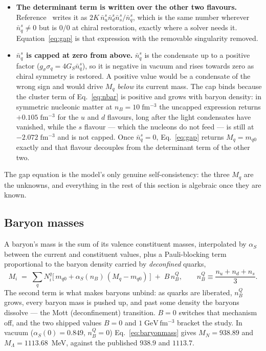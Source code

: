 \documentclass[aps,prc,onecolumn,superscriptaddress,nofootinbib,10pt]{revtex4-2}
\newcommand{\nB}{n_B}
\newcommand{\nbs}{\bar{n}^s}
\begin{document}
\begin{itemize}
\item \textbf{The determinant term is written over the other two flavours.}
  Reference~\cite{Xia2024} writes it as
  $2 K\, \nbs_u \nbs_d \nbs_s / \nbs_q$, which is the same number wherever
  $\nbs_q \ne 0$ but is $0/0$ at chiral restoration, exactly where a solver
  needs it. Equation~\eqref{eq:gap} is that expression with the removable
  singularity removed.
\item \textbf{$\nbs_q$ is capped at zero from above.} $\nbs_q$ is the
  condensate up to a positive factor ($g_\sigma\sigma_q = 4 G_S \nbs_q$), so
  it is negative in vacuum and rises towards zero as chiral symmetry is
  restored. A positive value would be a condensate of the wrong sign and
  would drive $M_q$ \emph{below} its current mass. The cap binds because the
  cluster term of Eq.~\eqref{eq:nbar} is positive and grows with baryon
  density: in symmetric nucleonic matter at $\nB = 10\;\mathrm{fm^{-3}}$ the
  uncapped expression returns $+0.105\;\mathrm{fm^{-3}}$ for the $u$ and $d$
  flavours, long after the light condensates have vanished, while the $s$
  flavour --- which the nucleons do not feed --- is still at
  $-2.072\;\mathrm{fm^{-3}}$ and is not capped. Once $\nbs_q = 0$,
  Eq.~\eqref{eq:gap} returns $M_q = m_{q0}$
  exactly and that flavour decouples from the determinant term of the other
  two.
\end{itemize}

\noindent
The gap equation is the model's only genuine self-consistency: the three
$M_q$ are the unknowns, and everything in the rest of this section is
algebraic once they are known.

\subsection{Baryon masses}

A baryon's mass is the sum of its valence constituent masses, interpolated by
$\alpha_S$ between the current and constituent values, plus a Pauli-blocking
term proportional to the baryon density carried by \emph{deconfined} quarks,
%
\begin{equation}
M_i \;=\; \sum_q N^q_i \big[\, m_{q0} + \alpha_S(\nB)\,(M_q - m_{q0}) \,\big]
      \;+\; B\, \nB^{Q} ,
\qquad
\nB^{Q} \equiv \frac{n_u + n_d + n_s}{3} .
\label{eq:baryonmass}
\end{equation}
%
The second term is what makes baryons unbind: as quarks are liberated,
$\nB^Q$ grows, every baryon mass is pushed up, and past some density the
baryons dissolve --- the Mott (deconfinement) transition. $B = 0$ switches
that mechanism off, and the two shipped values $B = 0$ and
$1\;\mathrm{GeV\,fm^{-3}}$ bracket the study. In vacuum
($\alpha_S(0) = 0.849$, $\nB^Q = 0$) Eq.~\eqref{eq:baryonmass} gives
$M_N = 938.89$ and $M_\Lambda = 1113.68$~MeV, against the published $938.9$
and $1113.7$.
\end{document}
